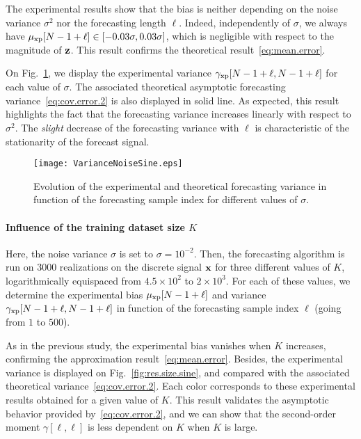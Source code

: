 The experimental results show that the bias is neither depending on the noise variance $\sigma^2$ nor the forecasting length $\ell$. Indeed, independently of $\sigma$, we always have $\mu_{{\mathrm{xp}}}[N-1+\ell]\in\left[-0.03\sigma,0.03\sigma\right]$, which is negligible with respect to the magnitude of ${\mathbf z}$. This result confirms the theoretical result~\eqref{eq:mean.error}. 

On Fig.~\ref{fig:res.noise.sine}, we display the experimental variance $\gamma_{{\mathrm{xp}}}[N-1+\ell,N-1+\ell]$ for each value of $\sigma$. The associated theoretical asymptotic forecasting variance~\eqref{eq:cov.error.2} is also displayed in solid line. As expected, this result highlights the fact that the forecasting variance increases linearly with respect to $\sigma^2$. The {\em slight} decrease of the forecasting variance with $\ell$ is characteristic of the stationarity of the forecast signal.

\begin{figure}
\texttt{[image: VarianceNoiseSine.eps]}
\caption{Evolution of the experimental and theoretical forecasting variance in function of the forecasting sample index for different values of $\sigma$.}
\label{fig:res.noise.sine}
\end{figure}

\paragraph{Influence of the training dataset size $K$} Here, the noise variance $\sigma$ is set to $\sigma=10^{-2}$. Then, the forecasting algorithm is run on 3000 realizations on the discrete signal ${\mathbf x}$ for three different values of $K$, logarithmically equispaced from $4.5\times 10^{2}$ to $2\times 10^{3}$. For each of these values, we determine the experimental bias $\mu_{{\mathrm{xp}}}[N-1+\ell]$ and variance $\gamma_{{\mathrm{xp}}}[N-1+\ell,N-1+\ell]$ in function of the forecasting sample index $\ell$ (going from $1$ to $500$). 

As in the previous study, the experimental bias vanishes when $K$ increases, confirming the approximation result~\eqref{eq:mean.error}. Besides, the experimental variance  is displayed on Fig.~\ref{fig:res.size.sine}, and compared with the associated theoretical variance~\eqref{eq:cov.error.2}. Each color corresponds to these experimental results obtained for a given value of $K$. This result validates the asymptotic behavior provided by~\eqref{eq:cov.error.2}, and we can show that the second-order moment $\gamma[\ell,\ell]$ is less dependent on $K$ when $K$ is large.


